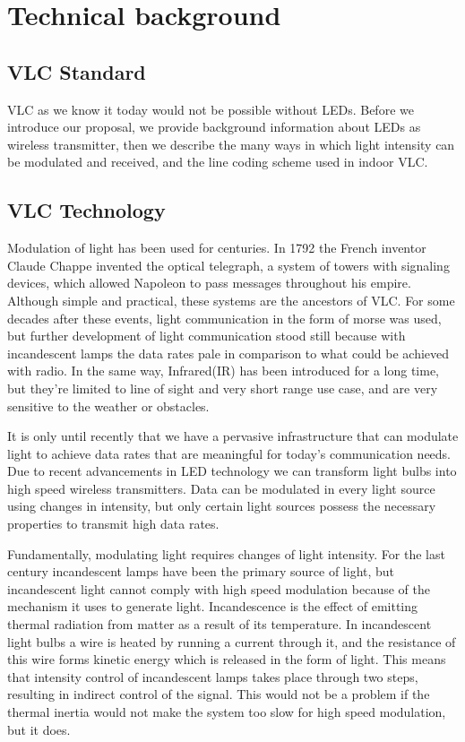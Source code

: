 \chapter{Technical background}
\label{Technical}


\section{VLC Standard}
VLC as we know it today would not be possible without LEDs. Before we introduce
our proposal, we provide background information
about LEDs as wireless transmitter, then we describe the many ways in which
light intensity can be modulated and received, and the line coding scheme used
in indoor VLC.

\section{VLC Technology}

Modulation of light has been used for centuries. In 1792 the French inventor
Claude Chappe invented the optical telegraph, a system of towers with signaling
devices, which allowed Napoleon to pass messages throughout his empire. Although
simple and practical, these systems are the ancestors of VLC. For some decades
after these events, light communication in the form of morse was used, but further
development of light communication stood still because with incandescent lamps
the data rates pale in comparison to what could be achieved with radio. In the same way,
Infrared(IR) has been introduced for a long time, but they're limited
to line of sight and very short range use case, and are very sensitive to the weather or obstacles.

It is only until recently that we have a pervasive infrastructure that can modulate
light to achieve data rates that are meaningful for today’s communication needs.
Due to recent advancements in LED technology we can transform light bulbs into
high speed wireless transmitters. Data can be modulated in every light source
using changes in intensity, but only certain light sources possess the necessary
properties to transmit high data rates.

Fundamentally, modulating light requires changes of light intensity. For the last
century incandescent lamps have been the primary source of light, but incandescent
light cannot comply with high speed modulation because of the mechanism
it uses to generate light. Incandescence is the effect of emitting thermal radiation
from matter as a result of its temperature. In incandescent light bulbs a wire is
heated by running a current through it, and the resistance of this wire forms kinetic 
energy which is released in the form of light. This means that intensity control
of incandescent lamps takes place through two steps, resulting in indirect control
of the signal. This would not be a problem if the thermal inertia would not make
the system too slow for high speed modulation, but it does.

